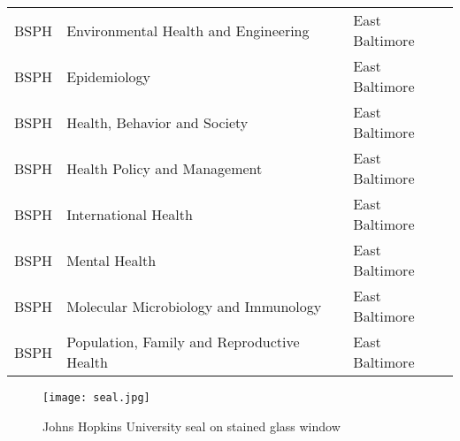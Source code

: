\begin{table}[ht]
\begin{tabular}{l|l|l}
BSPH & Environmental Health and Engineering & East Baltimore \\
BSPH & Epidemiology & East Baltimore \\
BSPH & Health, Behavior and Society & East Baltimore \\
BSPH & Health Policy and Management & East Baltimore \\
BSPH & International Health & East Baltimore \\
BSPH & Mental Health & East Baltimore \\
BSPH & Molecular Microbiology and Immunology & East Baltimore \\
BSPH & Population, Family and Reproductive Health & East Baltimore \\
\bottomrule
\end{tabular}
\end{table}

\begin{figure}[ht]
    \centering
    \texttt{[image: seal.jpg]}
    \caption{Johns Hopkins University seal on stained glass window}
    \label{fig:seal}
\end{figure}

